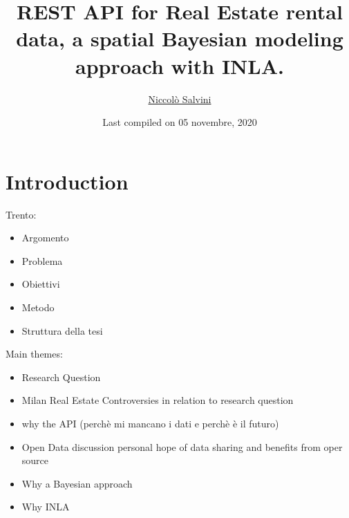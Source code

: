 \documentclass[
  12pt,
  a4paper,
  oneside]{book}
\title{REST API for Real Estate rental data, a spatial Bayesian modeling approach with INLA.}
\author{\href{https://niccolosalvini.netlify.app/}{Niccolò Salvini}}
\date{Last compiled on 05 novembre, 2020}
\providecommand{\tightlist}{%
  \setlength{\itemsep}{0pt}\setlength{\parskip}{0pt}}
\let\oldmaketitle\maketitle
\theoremstyle{definition}
\theoremstyle{definition}
\theoremstyle{definition}
\theoremstyle{remark}
\begin{document}
\maketitle


\newpage

\let\maketitle\oldmaketitle
\maketitle

{
\setcounter{tocdepth}{2}
\tableofcontents
}
\listoftables
\listoffigures
{}
\hypertarget{intro}{%
\chapter{Introduction}\label{intro}}

Trento:

\begin{itemize}
\tightlist
\item
  Argomento
\item
  Problema
\item
  Obiettivi
\item
  Metodo
\item
  Struttura della tesi
\end{itemize}

Main themes:

\begin{itemize}
\tightlist
\item
  Research Question
\item
  Milan Real Estate Controversies in relation to research question
\item
  why the API (perchè mi mancano i dati e perchè è il futuro)
\item
  Open Data discussion personal hope of data sharing and benefits from oper source
\item
  Why a Bayesian approach
\item
  Why INLA
\end{itemize}
\end{document}
